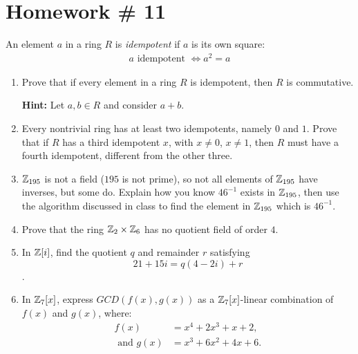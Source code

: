 \newpage 

\section{Homework \# 11}
\label{sec:HW11}
\vspace{0.1in}
\begin{definition}[Idempotent]
    An element $a$ in a ring $R$ is \textit{idempotent} if $a$ is its own square:
    \begin{align*}
        a \text{ idempotent } \iff a^2=a
    \end{align*}
\end{definition}
\begin{enumerate}
    \setlength{\itemsep}{10pt} %
    \item Prove that if every element in a ring $R$ is idempotent, then $R$ is commutative. 
    
    \textbf{Hint:} Let $a, b \in R$ and consider $a + b$.

    \item Every nontrivial ring has at least two idempotents, namely $0$ and $1$. Prove that if $R$ has a third idempotent $x$, with $x \neq 0$, $x \neq 1$, then $R$ must have a fourth idempotent, different from the other three.

    \item ${\mathbb{Z}}_{195}$ is not a field ($195$ is not prime), so not all elements of ${\mathbb{Z}}_{195}$ have inverses, but some do. Explain how you know $46^{-1}$ exists in ${\mathbb{Z}}_{195}$, then use the algorithm discussed in class to find the element in ${\mathbb{Z}}_{195}$ which is $46^{-1}$.

    \item Prove that the ring ${\mathbb{Z}}_2 \times {\mathbb{Z}}_6$ has no quotient field of order $4$.

    \item In ${\mathbb{Z}}[i]$, find the quotient $q$ and remainder $r$ satisfying
    \[
    21 + 15i = q(4 - 2i) + r
    \]
    .

    \item In ${\mathbb{Z}}_7[x]$, express $GCD(f(x), g(x))$ as a ${\mathbb{Z}}_7[x]$-linear combination of $f(x)$ and $g(x)$, where:
    \begin{align*}
        f(x) &= x^4 + 2x^3 + x + 2,\\
        \text{ and  } g(x) &= x^3 + 6x^2 + 4x + 6.
    \end{align*}
\end{enumerate}
\newpage 

